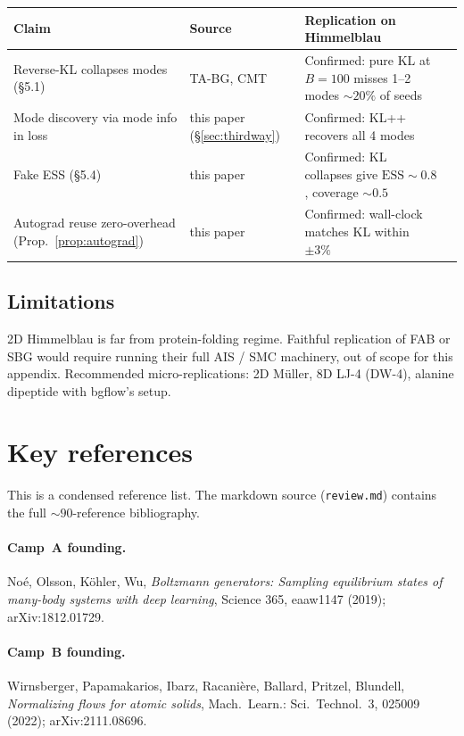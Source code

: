 \documentclass[11pt,letterpaper]{article}
\newcommand{\ESS}{\mathrm{ESS}}
\theoremstyle{plain}
\begin{document}
\begin{longtable}{@{}p{6cm}lll@{}}
\toprule
Claim & Source & Replication on Himmelblau\\
\midrule\endhead
Reverse-KL collapses modes (\S5.1) & TA-BG, CMT & Confirmed: pure KL at $B=100$ misses 1--2 modes $\sim 20\%$ of seeds\\
Mode discovery via mode info in loss & this paper (\S\ref{sec:thirdway}) & Confirmed: KL++ recovers all 4 modes\\
Fake ESS (\S5.4) & this paper & Confirmed: KL collapses give $\ESS\sim 0.8$, coverage $\sim 0.5$\\
Autograd reuse zero-overhead (Prop.~\ref{prop:autograd}) & this paper & Confirmed: wall-clock matches KL within $\pm 3\%$\\
\bottomrule
\end{longtable}

\subsection{Limitations}
2D Himmelblau is far from protein-folding regime. Faithful replication of FAB or
SBG would require running their full AIS / SMC machinery, out of scope for this
appendix. Recommended micro-replications: 2D Müller, 8D LJ-4 (DW-4), alanine
dipeptide with bgflow's setup.

\section{Key references}

This is a condensed reference list. The markdown source (\texttt{review.md})
contains the full $\sim 90$-reference bibliography.

\paragraph{Camp~A founding.} Noé, Olsson, Köhler, Wu, \emph{Boltzmann generators:
Sampling equilibrium states of many-body systems with deep learning}, Science
365, eaaw1147 (2019); arXiv:1812.01729.

\paragraph{Camp~B founding.} Wirnsberger, Papamakarios, Ibarz, Racanière, Ballard,
Pritzel, Blundell, \emph{Normalizing flows for atomic solids},
Mach.\ Learn.: Sci.\ Technol.\ 3, 025009 (2022); arXiv:2111.08696.
\end{document}
